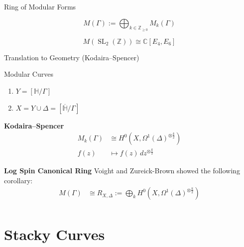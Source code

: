 \documentclass{beamer}
\theoremstyle{remark}
\newcommand\BH{{\mathbb H}}
\newcommand\BC{{\mathbb C}}
\newcommand\BZ{{\mathbb Z}}
\newcommand{\SL}{\operatorname{SL}}
\begin{document}

\begin{frame}{Ring of Modular Forms}

\begin{definition}
\[
	M(\Gamma) := \bigoplus_{k \in \BZ_{\geq 0}} M_k(\Gamma)
\]
\end{definition}


\begin{example}
\[
	M(\SL_2(\BZ)) \cong \BC[E_4,E_6]
\]
\end{example}

\end{frame}


\begin{frame}{Translation to Geometry (Kodaira--Spencer)}
\begin{block}{Modular Curves}
\begin{enumerate}
  \item $Y = [\BH / \Gamma]$
  \item $X = Y \cup \Delta = [\overline{\BH} / \Gamma]$
\end{enumerate}
\end{block}

\begin{block}{\textbf{Kodaira--Spencer}}
\begin{align*}
  M_k(\Gamma) &\cong H^0(X, \Omega^1(\Delta)^{\otimes \frac{k}{2}}) \\
	f(z) &\mapsto f(z)\, dz^{\otimes \frac{k}{2}}
\end{align*}
\end{block}

\begin{block}{\textbf{Log Spin Canonical Ring}}
Voight and Zureick-Brown showed the following corollary:
\begin{align*}
  M(\Gamma) &\cong R_{X,\Delta} := \bigoplus_k H^0(X, \Omega^1(\Delta)^{\otimes \frac{k}{2}}) \\
\end{align*}
\end{block}

\end{frame}

\section{Stacky Curves}
\end{document}
